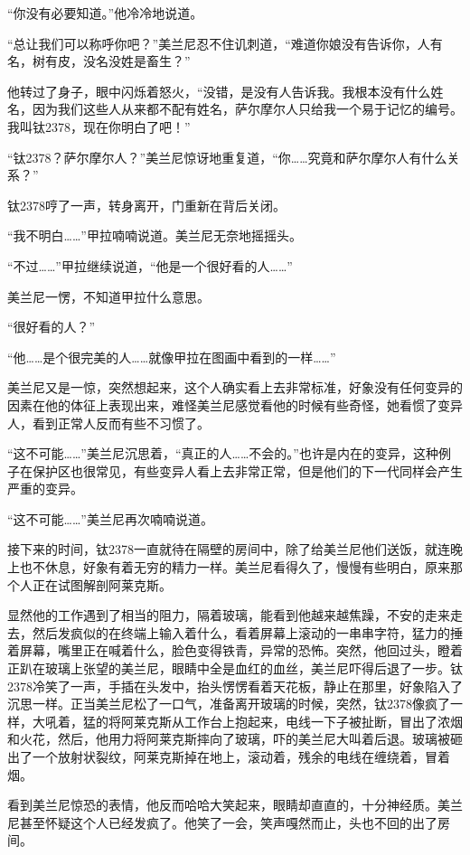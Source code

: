 “你没有必要知道。”他冷冷地说道。 

“总让我们可以称呼你吧？”美兰尼忍不住讥刺道，“难道你娘没有告诉你，人有名，树有皮，没名没姓是畜生？” 

他转过了身子，眼中闪烁着怒火，“没错，是没有人告诉我。我根本没有什么姓名，因为我们这些人从来都不配有姓名，萨尔摩尔人只给我一个易于记忆的编号。我叫钛2378，现在你明白了吧！” 

“钛2378？萨尔摩尔人？”美兰尼惊讶地重复道，“你……究竟和萨尔摩尔人有什么关系？” 

钛2378哼了一声，转身离开，门重新在背后关闭。 

“我不明白……”甲拉喃喃说道。美兰尼无奈地摇摇头。 

“不过……”甲拉继续说道，“他是一个很好看的人……” 

美兰尼一愣，不知道甲拉什么意思。 

“很好看的人？” 

“他……是个很完美的人……就像甲拉在图画中看到的一样……” 

美兰尼又是一惊，突然想起来，这个人确实看上去非常标准，好象没有任何变异的因素在他的体征上表现出来，难怪美兰尼感觉看他的时候有些奇怪，她看惯了变异人，看到正常人反而有些不习惯了。 

“这不可能……”美兰尼沉思着，“真正的人……不会的。”也许是内在的变异，这种例子在保护区也很常见，有些变异人看上去非常正常，但是他们的下一代同样会产生严重的变异。 

“这不可能……”美兰尼再次喃喃说道。 

接下来的时间，钛2378一直就待在隔壁的房间中，除了给美兰尼他们送饭，就连晚上也不休息，好象有着无穷的精力一样。美兰尼看得久了，慢慢有些明白，原来那个人正在试图解剖阿莱克斯。 

显然他的工作遇到了相当的阻力，隔着玻璃，能看到他越来越焦躁，不安的走来走去，然后发疯似的在终端上输入着什么，看着屏幕上滚动的一串串字符，猛力的捶着屏幕，嘴里正在喊着什么，脸色变得铁青，异常的恐怖。突然，他回过头，瞪着正趴在玻璃上张望的美兰尼，眼睛中全是血红的血丝，美兰尼吓得后退了一步。钛2378冷笑了一声，手插在头发中，抬头愣愣看着天花板，静止在那里，好象陷入了沉思一样。正当美兰尼松了一口气，准备离开玻璃的时候，突然，钛2378像疯了一样，大吼着，猛的将阿莱克斯从工作台上抱起来，电线一下子被扯断，冒出了浓烟和火花，然后，他用力将阿莱克斯摔向了玻璃，吓的美兰尼大叫着后退。玻璃被砸出了一个放射状裂纹，阿莱克斯掉在地上，滚动着，残余的电线在缠绕着，冒着烟。 

看到美兰尼惊恐的表情，他反而哈哈大笑起来，眼睛却直直的，十分神经质。美兰尼甚至怀疑这个人已经发疯了。他笑了一会，笑声嘎然而止，头也不回的出了房间。 

